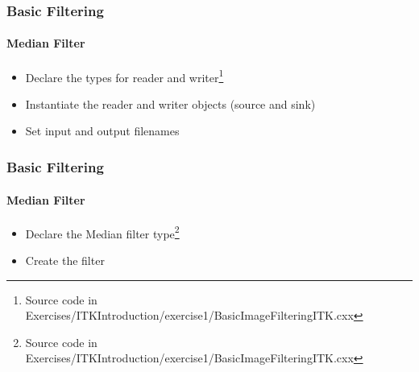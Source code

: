 {
\begin{frame}[fragile]
\frametitle{Basic Filtering}
\framesubtitle{Median Filter}
\begin{itemize}
\item Declare the types for reader and writer\footnote{Source code in Exercises/ITKIntroduction/exercise1/BasicImageFilteringITK.cxx}
\end{itemize}
\begin{center}

\end{center}
\pause
\begin{itemize}
\item Instantiate the reader and writer objects (source and sink)
\end{itemize}
\begin{center}

\end{center}
\pause
\begin{itemize}
\item Set input and output filenames
\end{itemize}
\begin{center}

\end{center}
\end{frame}
}

{
\begin{frame}[fragile]
\frametitle{Basic Filtering}
\framesubtitle{Median Filter}
\begin{itemize}
\item Declare the Median filter type\footnote{Source code in Exercises/ITKIntroduction/exercise1/BasicImageFilteringITK.cxx}
\end{itemize}
\begin{center}

\end{center}
\pause
\begin{itemize}
\item Create the filter
\end{itemize}
\begin{center}

\end{center}
\end{frame}
}

